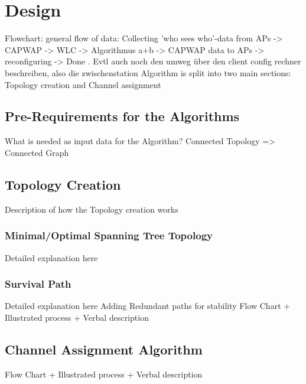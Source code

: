 \chapter{Design}
Flowchart: general flow of data:
Collecting 'who sees who'-data from APs -> CAPWAP -> WLC -> Algorithmus a+b -> CAPWAP data to APs -> reconfiguring -> Done
. Evtl auch noch den umweg über den client config rechner beschreiben, also die zwischenstation 
Algorithm is split into two main sections: Topology creation and Channel assignment \newline
\section{Pre-Requirements for the Algorithms}
What is needed as input data for the Algorithm?
  Connected Topology => Connected Graph
\section{Topology Creation}
  Description of how the Topology creation works
  \subsection{Minimal/Optimal Spanning Tree Topology}
    Detailed explanation here
  \subsection{Survival Path}
    Detailed explanation here \newline
    Adding Redundant paths for stability \newline
    Flow Chart + Illustrated process + Verbal description \newline
\section{Channel Assignment Algorithm}
  Flow Chart + Illustrated process + Verbal description \cite{caa_tricky}

